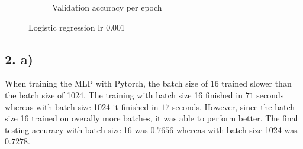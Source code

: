 \documentclass[11pt]{article}
\begin{document}
\begin{figure}[h!]
\begin{subfigure}{.5\textwidth}
  \caption{Validation accuracy per epoch}
\end{subfigure}
\caption{Logistic regression lr 0.001}
\label{fig:regression_lr_0.001}
\end{figure}

\pagebreak

\subsection{2. a)}
When training the MLP with Pytorch, the batch size of 16 trained slower than the batch size of 1024.
The training with batch size 16 finished in $71$ seconds whereas with batch size 1024 it finished in $17$ seconds.
However, since the batch size 16 trained on overally more batches, it was able to perform better.
The final testing accuracy with batch size 16 was $0.7656$ whereas with batch size 1024 was $0.7278$.
\end{document}
